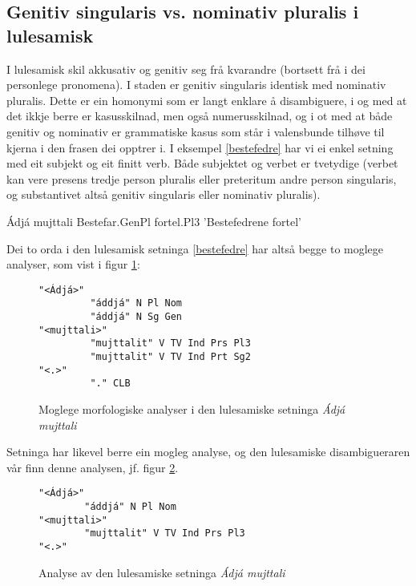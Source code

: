 \documentclass[a4paper,norsk]{article}
\begin{document}
\subsection{Genitiv singularis vs. nominativ pluralis i lulesamisk}

I lulesamisk skil akkusativ og genitiv seg frå kvarandre (bortsett frå i dei personlege pronomena). I staden er genitiv singularis identisk med nominativ pluralis. Dette er ein homonymi som er langt enklare å disambiguere, i og med at det ikkje berre er kasusskilnad, men også numerusskilnad, og i ot med at både genitiv og nominativ er  grammatiske kasus som står i valensbunde tilhøve til kjerna i den frasen dei opptrer i. I eksempel \ref{bestefedre} har vi ei enkel setning med eit subjekt og eit finitt verb. Både subjektet og verbet er tvetydige (verbet kan vere presens tredje person pluralis eller preteritum andre person singularis, og substantivet altså genitiv singularis eller nominativ pluralis). %

\begin{example}\label{bestefedre}
\gll Ádjá mujttali
    Bestefar.GenPl fortel.Pl3
\glt 'Bestefedrene fortel'    
\glend
\end{example}%

Dei to orda i den lulesamisk setninga \ref{bestefedre} har altså begge to moglege analyser, som vist i figur \ref{am-multi}:

\begin{figure}[htbp]
\begin{center}
\begin{verbatim}
"<Ádjá>"
         "áddjá" N Pl Nom
         "áddjá" N Sg Gen
"<mujttali>"
         "mujttalit" V TV Ind Prs Pl3
         "mujttalit" V TV Ind Prt Sg2
"<.>"
         "." CLB
\end{verbatim}
\caption{Moglege morfologiske analyser i den lulesamiske setninga \textit{Ádjá mujttali}}
\label{am-multi}
\end{center}
\end{figure}

Setninga har likevel berre ein mogleg analyse, og den lulesamiske disambigueraren vår finn denne analysen, jf. figur \ref{am}. %

\begin{figure}[htbp]
\begin{center}
\begin{verbatim}
"<Ádjá>"
        "áddjá" N Pl Nom
"<mujttali>"
        "mujttalit" V TV Ind Prs Pl3
"<.>"
\end{verbatim}
\caption{Analyse av den lulesamiske setninga \textit{Ádjá mujttali}}
\label{am}
\end{center}
\end{figure}
\end{document}
